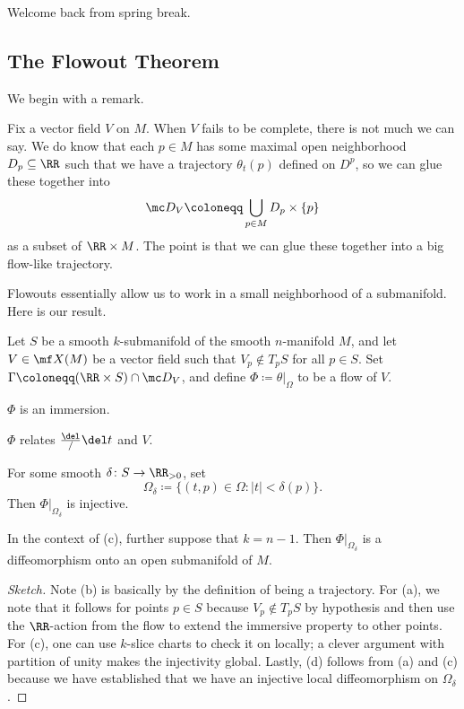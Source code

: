 \documentclass[../notes.tex]{subfiles}
\begin{document}
Welcome back from spring break.

\subsection{The Flowout Theorem}
We begin with a remark.
\begin{remark}
	Fix a vector field $V$ on $M$. When $V$ fails to be complete, there is not much we can say. We do know that each $p\in M$ has some maximal open neighborhood $D_p\subseteq\RR$ such that we have a trajectory $\theta_t(p)$ defined on $D^p$, so we can glue these together into
	\[\mc D_V\coloneqq\bigcup_{p\in M}D_p\times\{p\}\]
	as a subset of $\RR\times M$. The point is that we can glue these together into a big flow-like trajectory.
\end{remark}
Flowouts essentially allow us to work in a small neighborhood of a submanifold. Here is our result.
\begin{theorem}[Flowout] \label{thm:flowout}
	Let $S$ be a smooth $k$-submanifold of the smooth $n$-manifold $M$, and let $V\in\mf X(M)$ be a vector field such that $V_p\notin T_pS$ for all $p\in S$. Set $\Gamma\coloneqq(\RR\times S)\cap\mc D_V$, and define $\Phi\coloneqq\theta|_\Omega$ to be a flow of $V$.
	\begin{listalph}
		\item $\Phi$ is an immersion.
		\item $\Phi$ relates $\frac\del/\del t$ and $V$.
		\item For some smooth $\delta\colon S\to\RR_{>0}$, set
		\[\Omega_\delta\coloneqq\{(t,p)\in\Omega:\left|t\right|<\delta(p)\}.\]
		Then $\Phi|_{\Omega_\delta}$ is injective.
		\item In the context of (c), further suppose that $k=n-1$. Then $\Phi|_{\Omega_\delta}$ is a diffeomorphism onto an open submanifold of $M$.
	\end{listalph}
\end{theorem}
\begin{proof}[Sketch]
	Note (b) is basically by the definition of being a trajectory. For (a), we note that it follows for points $p\in S$ because $V_p\notin T_pS$ by hypothesis and then use the $\RR$-action from the flow to extend the immersive property to other points. For (c), one can use $k$-slice charts to check it on locally; a clever argument with partition of unity makes the injectivity global. Lastly, (d) follows from (a) and (c) because we have established that we have an injective local diffeomorphism on $\Omega_\delta$.
\end{proof}
\end{document}
